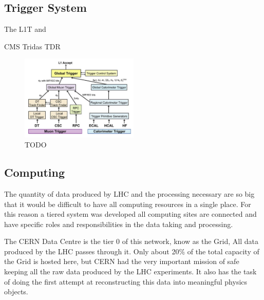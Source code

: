 \subsection{Trigger System}
\label{SUBSECTION:ExperimentalApparatus_CMS_Trigger}

The \gls{L1T} and 

CMS Tridas TDR\cite{CMSTDR:CMSTridasTDR} 

\begin{figure}[!htb]
  \centering
  \includegraphics[width=0.50\textwidth]{Chapter02/CMS/Images/CMS_L1T_Layout.png}
  \caption{TODO}
  \label{FIGURE:ExperimentalApparatus_CMS_L1T_Layout}
\end{figure}

\subsection{Computing}
\label{SUBSECTION:ExperimentalApparatus_CMS_Computing}


The quantity of data produced by \gls{LHC} and the processing necessary are so big that it would be difficult to have all computing resources in a single place. For this reason a tiered system was developed all computing sites are connected and have specific roles and responsibilities in the data taking and processing.

The \gls{CERN} Data Centre is the tier 0 of this network, know as the Grid, All data produced by the \gls{LHC} passes through it. Only about 20\% of the total capacity of the Grid is hosted here, but \gls{CERN} had the very important mission of safe keeping all the raw data produced by the \gls{LHC} experiments. It also has the task of doing the first attempt at reconstructing this data into meaningful physics objects. 

